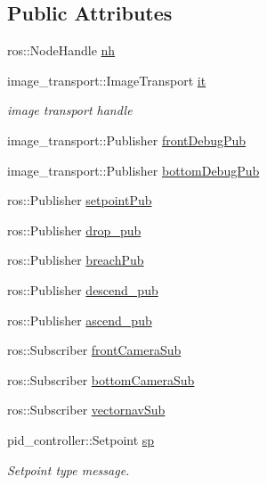 \subsection*{Public Attributes}
\begin{DoxyCompactItemize}
\item 
ros\+::\+Node\+Handle \hyperlink{classPathPlanner_a3728ed52563a28d32c19efc157771e96}{nh}
\item 
image\+\_\+transport\+::\+Image\+Transport \hyperlink{classPathPlanner_afdf6f6e68086d7992206f84d37b56c84}{it}
\begin{DoxyCompactList}\small\item\em image transport handle \end{DoxyCompactList}\item 
image\+\_\+transport\+::\+Publisher \hyperlink{classPathPlanner_a8a5f65b9ca4a6ddd19e046c46ad7e349}{front\+Debug\+Pub}
\item 
image\+\_\+transport\+::\+Publisher \hyperlink{classPathPlanner_aae9f1307dab87b0979497f41553dc34e}{bottom\+Debug\+Pub}
\item 
ros\+::\+Publisher \hyperlink{classPathPlanner_ac2cd91552262491438a806f3229fe5f8}{setpoint\+Pub}
\item 
ros\+::\+Publisher \hyperlink{classPathPlanner_a5950dcdaa13fde281ad87bc06bb4221c}{drop\+\_\+pub}
\item 
ros\+::\+Publisher \hyperlink{classPathPlanner_a6ad35bcf1143889a2273362476028445}{breach\+Pub}
\item 
ros\+::\+Publisher \hyperlink{classPathPlanner_af0db2ddfb46fd54f8c8b942b44f67e75}{descend\+\_\+pub}
\item 
ros\+::\+Publisher \hyperlink{classPathPlanner_a8afd938d26553fae883bd02ed0d44458}{ascend\+\_\+pub}
\item 
ros\+::\+Subscriber \hyperlink{classPathPlanner_ae5bf7f525a1723eef45c2887e8b3fbae}{front\+Camera\+Sub}
\item 
ros\+::\+Subscriber \hyperlink{classPathPlanner_a180b062cc5656e45a1f789689cc5d130}{bottom\+Camera\+Sub}
\item 
ros\+::\+Subscriber \hyperlink{classPathPlanner_a0527b6b13cdffd139aa4e2acbcb8cc32}{vectornav\+Sub}
\item 
pid\+\_\+controller\+::\+Setpoint \hyperlink{classPathPlanner_a6b892ed37642ddc634c9dd245f20ca40}{sp}
\begin{DoxyCompactList}\small\item\em Setpoint type message. \end{DoxyCompactList}\item 

\end{DoxyCompactItemize}
